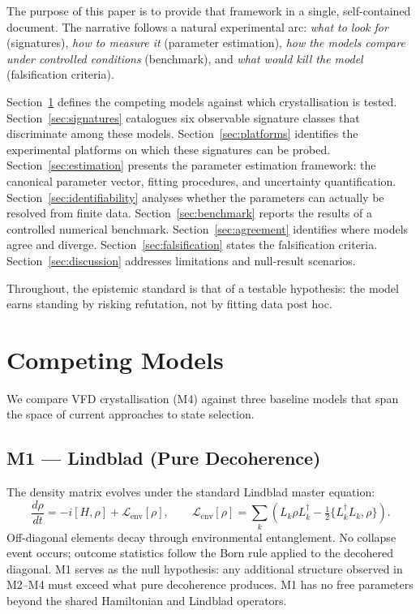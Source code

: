 \documentclass[12pt]{article}
\begin{document}
The purpose of this paper is to provide that framework in a single, self-contained document. The narrative follows a natural experimental arc: \emph{what to look for} (signatures), \emph{how to measure it} (parameter estimation), \emph{how the models compare under controlled conditions} (benchmark), and \emph{what would kill the model} (falsification criteria).

Section~\ref{sec:models} defines the competing models against which crystallisation is tested. Section~\ref{sec:signatures} catalogues six observable signature classes that discriminate among these models. Section~\ref{sec:platforms} identifies the experimental platforms on which these signatures can be probed. Section~\ref{sec:estimation} presents the parameter estimation framework: the canonical parameter vector, fitting procedures, and uncertainty quantification. Section~\ref{sec:identifiability} analyses whether the parameters can actually be resolved from finite data. Section~\ref{sec:benchmark} reports the results of a controlled numerical benchmark. Section~\ref{sec:agreement} identifies where models agree and diverge. Section~\ref{sec:falsification} states the falsification criteria. Section~\ref{sec:discussion} addresses limitations and null-result scenarios.

Throughout, the epistemic standard is that of a testable hypothesis: the model earns standing by risking refutation, not by fitting data post hoc.

\section{Competing Models}
\label{sec:models}

We compare VFD crystallisation (M4) against three baseline models that span the space of current approaches to state selection.

\subsection{M1 --- Lindblad (Pure Decoherence)}

The density matrix evolves under the standard Lindblad master equation:
\begin{equation}\label{eq:lindblad}
\frac{d\rho}{dt} = -i[H, \rho] + \mathcal{L}_{\mathrm{env}}[\rho], \qquad
\mathcal{L}_{\mathrm{env}}[\rho] = \sum_k \left( L_k \rho L_k^\dagger - \tfrac{1}{2}\{L_k^\dagger L_k, \rho\} \right).
\end{equation}
Off-diagonal elements decay through environmental entanglement. No collapse event occurs; outcome statistics follow the Born rule applied to the decohered diagonal. M1 serves as the null hypothesis: any additional structure observed in M2--M4 must exceed what pure decoherence produces. M1 has no free parameters beyond the shared Hamiltonian and Lindblad operators.
\end{document}
